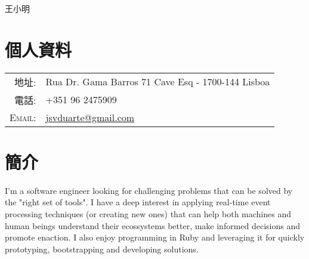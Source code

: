 \documentclass[a4paper,10pt]{article}
\begin{document}
\pagestyle{empty} %

\par{\centering
	{\Huge 王小明
}\bigskip\par}

\section{個人資料}

\begin{tabular}{rl}
    \textsc{地址:}  & Rua Dr. Gama Barros 71 Cave Esq - 1700-144 Lisboa\\
    \textsc{電話:}  & +351 96 2475909\\
    \textsc{Email:} & \href{mailto:jsvduarte@gmail.com}{jsvduarte@gmail.com} \\
\end{tabular}

\section{簡介}
I'm a software engineer looking for challenging problems that can be solved by
the "right set of tools". I have a deep interest in applying real-time event processing
techniques (or creating new ones) that can help both machines and human beings understand
their ecossystems better, make informed decisions and promote enaction. I also enjoy programming in Ruby
and leveraging it for quickly prototyping, bootstrapping and developing solutions.

\end{document}
